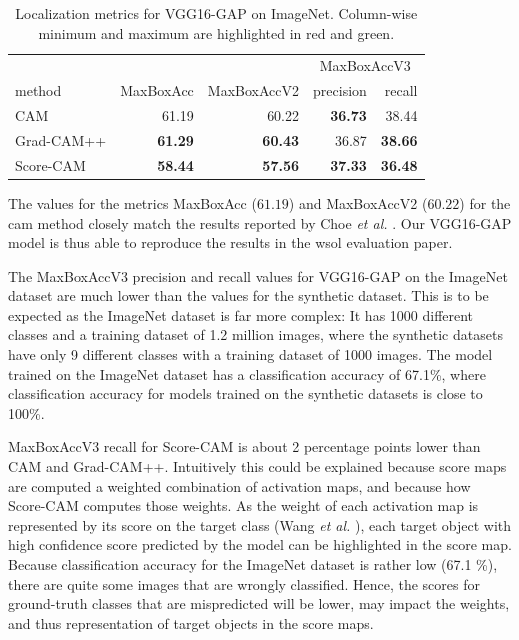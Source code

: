 \begin{table}[h]
\centering
\begin{tabular}{lrrrr}
\toprule
 & & & \multicolumn{2}{c}{MaxBoxAccV3} \\
method & MaxBoxAcc & MaxBoxAccV2 & precision & recall \\
\cmidrule(lr){1-1} \cmidrule(lr){2-5}
CAM & 61.19 & 60.22 & \color{purple} \bfseries 36.73 & 38.44 \\
Grad-CAM++ & \color{teal} \bfseries 61.29 & \color{teal} \bfseries 60.43 & 36.87 & \color{teal} \bfseries 38.66 \\
Score-CAM & \color{purple} \bfseries 58.44 & \color{purple} \bfseries 57.56 & \color{teal} \bfseries 37.33 & \color{purple} \bfseries 36.48 \\
\bottomrule
\end{tabular}
\caption[Localization metrics for VGG16-GAP on ImageNet]{Localization metrics for VGG16-GAP on ImageNet. Column-wise minimum and maximum are highlighted in red and green.}
\label{tab:metrics_vgg16_gap_imagenet}
\end{table}

The values for the metrics MaxBoxAcc ($61.19$) and MaxBoxAccV2 ($60.22$) for the \acrshort{cam} method closely match the results reported by Choe \textit{et al.} \cite{choe2020evaluating}. Our VGG16-GAP model is thus able to reproduce the results in the \acrshort{wsol} evaluation paper.

The MaxBoxAccV3 precision and recall values for VGG16-GAP on the ImageNet dataset are much lower than the values for the synthetic dataset. This is to be expected as the ImageNet dataset is far more complex: It has 1000 different classes and a training dataset of 1.2 million images, where the synthetic datasets have only 9 different classes with a training dataset of 1000 images. The model trained on the ImageNet dataset has a classification accuracy of 67.1\%, where classification accuracy for models trained on the synthetic datasets is close to 100\%. 

MaxBoxAccV3 recall for Score-CAM is about 2 percentage points lower than CAM and Grad-CAM++. Intuitively this could be explained because score maps are computed a weighted combination of activation maps, and because how Score-CAM computes those weights. As the weight of each activation map is represented by its score on the target class (Wang \textit{et al.} \cite{wang2020score}), each target object with high confidence score predicted by the model can be highlighted in the score map. Because classification accuracy for the ImageNet dataset is rather low (67.1 \%), there are quite some images that are wrongly classified. Hence, the scores for ground-truth classes that are mispredicted will be lower, may impact the weights, and thus representation of target objects in the score maps.

